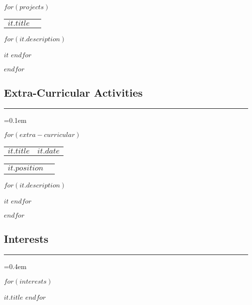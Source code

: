 \documentclass[10pt,letterpaper]{article}
\makeatletter
\def\sectionSpace{\vspace{-10pt}}
\newcommand\resumesection[1]
{\subsection*{#1}
\vspace{-0.2em}
\hrule
\vspace{0.4em}}
\newcommand{\headerrow}[2]
{\begin{tabular*}{\linewidth}{l@{\extracolsep{\fill}}r}
    #1 &
	#2 \\
\end{tabular*}}
\makeatother
\begin{document}
    $for(projects)$
    \headerrow
		{\textbf{$it.title$}}
		{}
    \vspace{-16pt}
	\begin{itemize*}
        $for(it.description)$
	    \item $it$
        $endfor$
	\end{itemize*}
	\vspace{-2pt}
    $endfor$
	\sectionSpace

\resumesection{Extra-Curricular Activities}
\parskip=0.1em

    $for(extra-curricular)$
	\headerrow
		{\textbf{$it.title$}}
		{\textbf{$it.date$}}
	\vspace{-5pt}
	\headerrow
        {$it.position$}
		{}
    \begin{itemize*}
        $for(it.description)$
        \item $it$
        $endfor$
    \end{itemize*}
	\vspace{-2pt}
    $endfor$
	\sectionSpace

\resumesection{Interests}
\parskip=0.4em

    \begin{itemize*}
        $for(interests)$
        \item $it.title$
        $endfor$
    \end{itemize*}
\end{document}
